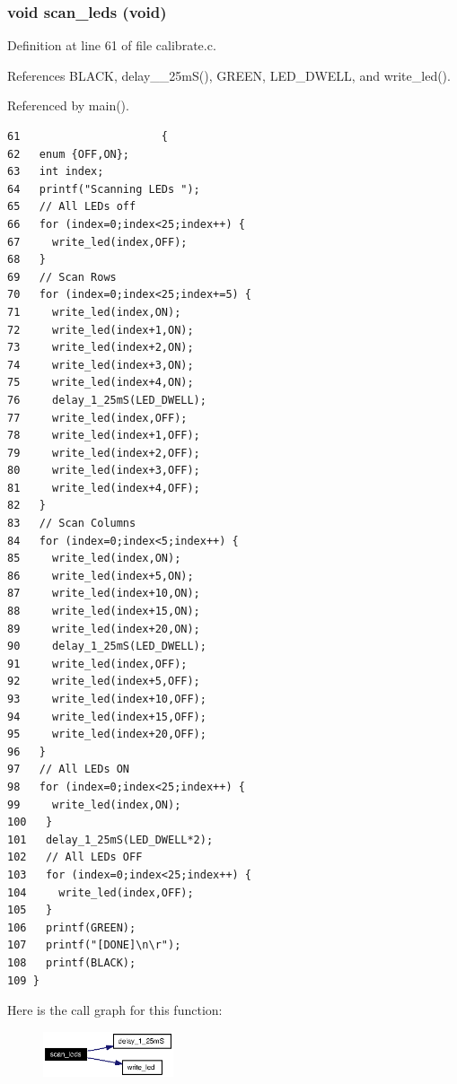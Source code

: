 \subsubsection{\setlength{\rightskip}{0pt plus 5cm}void scan\_\-leds (void)}\label{calibrate_8h_a3}




Definition at line 61 of file calibrate.c.

References BLACK, delay\_\_\-25m\-S(), GREEN, LED\_\-DWELL, and write\_\-led().

Referenced by main().

\footnotesize\begin{verbatim}61                      {
62   enum {OFF,ON};
63   int index; 
64   printf("Scanning LEDs ");
65   // All LEDs off
66   for (index=0;index<25;index++) {
67     write_led(index,OFF);
68   }
69   // Scan Rows 
70   for (index=0;index<25;index+=5) {
71     write_led(index,ON);
72     write_led(index+1,ON);
73     write_led(index+2,ON);
74     write_led(index+3,ON);
75     write_led(index+4,ON);
76     delay_1_25mS(LED_DWELL);
77     write_led(index,OFF);
78     write_led(index+1,OFF);
79     write_led(index+2,OFF);
80     write_led(index+3,OFF);
81     write_led(index+4,OFF);
82   }
83   // Scan Columns 
84   for (index=0;index<5;index++) {
85     write_led(index,ON);
86     write_led(index+5,ON);
87     write_led(index+10,ON);
88     write_led(index+15,ON);
89     write_led(index+20,ON);
90     delay_1_25mS(LED_DWELL);
91     write_led(index,OFF);
92     write_led(index+5,OFF);
93     write_led(index+10,OFF);
94     write_led(index+15,OFF);
95     write_led(index+20,OFF);
96   }
97   // All LEDs ON
98   for (index=0;index<25;index++) {
99     write_led(index,ON);
100   }
101   delay_1_25mS(LED_DWELL*2);
102   // All LEDs OFF
103   for (index=0;index<25;index++) {
104     write_led(index,OFF);
105   }
106   printf(GREEN);
107   printf("[DONE]\n\r");
108   printf(BLACK);
109 }
\end{verbatim}\normalsize 




Here is the call graph for this function:\begin{figure}[H]
\begin{center}
\leavevmode
\includegraphics[width=109pt]{calibrate_8h_a3_cgraph}
\end{center}
\end{figure}

